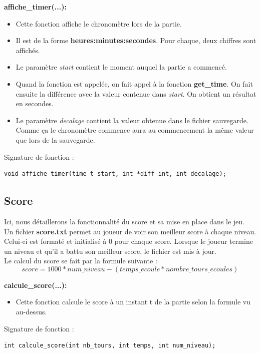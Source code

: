 \documentclass{article}
\begin{document}
\textbf{affiche\_timer(...):}
\begin{itemize}
\item Cette fonction affiche le chronomètre lors de la partie.
\item Il est de la forme \textbf{heures:minutes:secondes}. Pour chaque, deux chiffres sont affichés.
\item Le paramètre \textit{start} contient le moment auquel la partie a commencé.
\item Quand la fonction est appelée, on fait appel à la fonction \textbf{get\_time}. On fait ensuite la différence avec la valeur contenue dans \textit{start}. On obtient un résultat en secondes.
\item Le paramètre \textit{decalage} contient la valeur obtenue dans le fichier sauvegarde. Comme ça le chronomètre commence aura au commencement la même valeur que lors de la sauvegarde.
\end{itemize}
Signature de fonction :
\begin{lstlisting}
void affiche_timer(time_t start, int *diff_int, int decalage);
\end{lstlisting}
\newpage

\subsection{Score}
Ici, nous détaillerons la fonctionnalité du score et sa mise en place dans le jeu.\\ 
Un fichier \textbf{score.txt} permet au joueur de voir son meilleur score à chaque niveau. Celui-ci est formaté et initialisé à 0 pour chaque score. Lorsque le joueur termine un niveau et qu'il a battu son meilleur score, le fichier est mis à jour.\\
Le calcul du score se fait par la formule suivante :
\begin{equation}
    score = 1000*num\_niveau - (temps\_ecoule*nombre\_tours\_ecoules)
\end{equation}

\textbf{calcule\_score(...):}
\begin{itemize}
\item Cette fonction calcule le score à un instant t de la partie selon la formule vu au-dessus.
\end{itemize}
Signature de fonction :
\begin{lstlisting}
int calcule_score(int nb_tours, int temps, int num_niveau);
\end{lstlisting}
\end{document}
